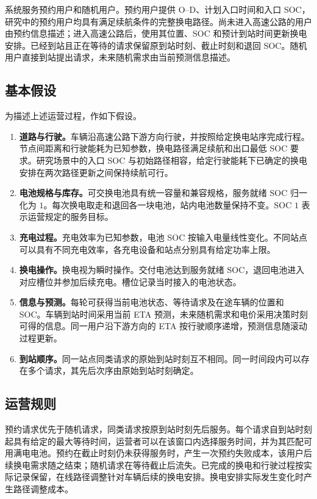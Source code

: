 \documentclass[12pt,a4paper,UTF8]{ctexart}
\numberwithin{equation}{section}
\begin{document}
系统服务预约用户和随机用户。预约用户提供 O--D、计划入口时间和入口 SOC，研究中的预约用户均具有满足续航条件的完整换电路径。尚未进入高速公路的用户由预约信息描述；进入高速公路后，使用其位置、SOC 和预计到站时间更新换电安排。已经到站且正在等待的请求保留原到站时刻、截止时刻和退回 SOC。随机用户直接到站提出请求，未来随机需求由当前预测信息描述。

\subsection{基本假设}
为描述上述运营过程，作如下假设。
\begin{enumerate}[label=\textbf{假设\arabic*.},leftmargin=4.4em]
  \item \textbf{道路与行驶。}车辆沿高速公路下游方向行驶，并按照给定换电站序完成行程。节点间距离和行驶能耗为已知参数，换电路径满足续航和出口最低 SOC 要求。研究场景中的入口 SOC 与初始路径相容，给定行驶能耗下已确定的换电安排在两次路径更新之间保持续航可行。
  \item \textbf{电池规格与库存。}可交换电池具有统一容量和兼容规格，服务就绪 SOC 归一化为 $1$。每次换电取走和退回各一块电池，站内电池数量保持不变。SOC $1$ 表示运营规定的服务目标。
  \item \textbf{充电过程。}充电效率为已知参数，电池 SOC 按输入电量线性变化。不同站点可以具有不同充电效率，各充电设备和站点分别具有给定功率上限。
  \item \textbf{换电操作。}换电视为瞬时操作。交付电池达到服务就绪 SOC，退回电池进入对应槽位并参加后续充电。槽位记录当时接入的电池状态。
  \item \textbf{信息与预测。}每轮可获得当前电池状态、等待请求及在途车辆的位置和 SOC。车辆到站时间采用当前 ETA 预测，未来随机需求和电价采用决策时刻可得的信息。同一用户沿下游方向的 ETA 按行驶顺序递增，预测信息随滚动过程更新。
  \item \textbf{到站顺序。}同一站点同类请求的原始到站时刻互不相同。同一时间段内可以存在多个请求，其先后次序由原始到站时刻确定。
\end{enumerate}

\subsection{运营规则}
预约请求优先于随机请求，同类请求按原到站时刻先后服务。每个请求自到站时刻起具有给定的最大等待时间，运营者可以在该窗口内选择服务时间，并为其匹配可用满电电池。预约在截止时刻仍未获得服务时，产生一次预约失败成本，该用户后续换电需求随之结束；随机请求在等待截止后流失。已完成的换电和行驶过程按实际记录保留，在线路径调整针对车辆后续的换电安排。换电安排实际发生变化时产生路径调整成本。
\end{document}
